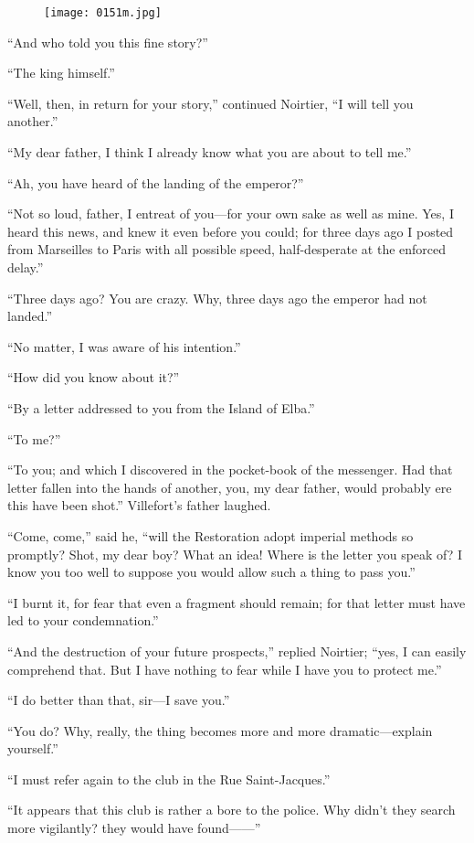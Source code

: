 \begin{figure}[ht]
\texttt{[image: 0151m.jpg]}
\end{figure}

“And who told you this fine story?”

“The king himself.”

“Well, then, in return for your story,” continued Noirtier, “I will
tell you another.”

“My dear father, I think I already know what you are about to tell me.”

“Ah, you have heard of the landing of the emperor?”

“Not so loud, father, I entreat of you—for your own sake as well as
mine. Yes, I heard this news, and knew it even before you could; for
three days ago I posted from Marseilles to Paris with all possible
speed, half-desperate at the enforced delay.”

“Three days ago? You are crazy. Why, three days ago the emperor had not
landed.”

“No matter, I was aware of his intention.”

“How did you know about it?”

“By a letter addressed to you from the Island of Elba.”

“To me?”

“To you; and which I discovered in the pocket-book of the messenger.
Had that letter fallen into the hands of another, you, my dear father,
would probably ere this have been shot.” Villefort’s father laughed.

“Come, come,” said he, “will the Restoration adopt imperial methods so
promptly? Shot, my dear boy? What an idea! Where is the letter you
speak of? I know you too well to suppose you would allow such a thing
to pass you.”

“I burnt it, for fear that even a fragment should remain; for that
letter must have led to your condemnation.”

“And the destruction of your future prospects,” replied Noirtier; “yes,
I can easily comprehend that. But I have nothing to fear while I have
you to protect me.”

“I do better than that, sir—I save you.”

“You do? Why, really, the thing becomes more and more dramatic—explain
yourself.”

“I must refer again to the club in the Rue Saint-Jacques.”

“It appears that this club is rather a bore to the police. Why didn’t
they search more vigilantly? they would have found——”

